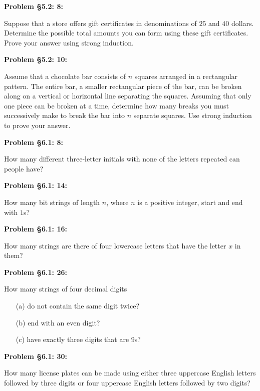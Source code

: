 \documentclass{article}
\newenvironment{problem}[1]
    {\begin{mdframed}[default]
    \textbf{Problem #1:}
    }
    {\end{mdframed}
    }
\begin{document}
\begin{problem}{\S 5.2: 8}
Suppose that a store offers gift certificates in denominations of $25$ and $40$ dollars. Determine the possible total amounts you can form using these gift certificates. Prove your answer using strong induction.
\end{problem}

\begin{problem}{\S 5.2: 10}
Assume that a chocolate bar consists of $n$ squares arranged in a rectangular pattern. The entire bar, a smaller rectangular piece of the bar, can be broken along on a vertical or horizontal line separating the squares. Assuming that only one piece can be broken at a time, determine how many breaks you must successively make to break the bar into $n$ separate squares. Use strong induction to prove your answer.
\end{problem}

\begin{problem}{\S 6.1: 8}
How many different three-letter initials with none of the letters repeated can people have?
\end{problem}

\begin{problem}{\S 6.1: 14}
How many bit strings of length $n$, where $n$ is a positive integer, start and end with $1$s?
\end{problem}

\begin{problem}{\S 6.1: 16}
How many strings are there of four lowercase letters that have the letter $x$ in them?
\end{problem}

\begin{problem}{\S 6.1: 26}
How many strings of four decimal digits
\begin{enumerate}
    \item[(a)] do not contain the same digit twice?
    \item[(b)] end with an even digit?
    \item[(c)] have exactly three digits that are $9$s?
\end{enumerate}
\end{problem}

\begin{problem}{\S 6.1: 30}
How many license plates can be made using either three uppercase English letters followed by three digits or four uppercase English letters followed by two digits?
\end{problem}
\end{document}
